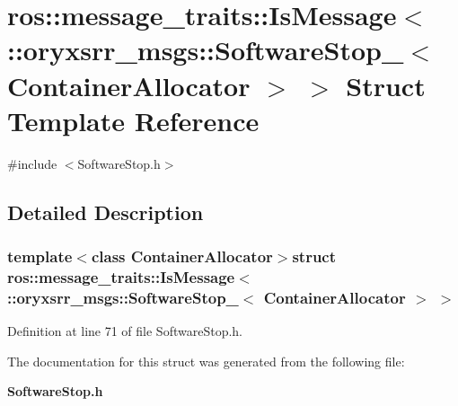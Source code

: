 \section{ros\-:\-:message\-\_\-traits\-:\-:\-Is\-Message$<$ \-:\-:oryxsrr\-\_\-msgs\-:\-:\-Software\-Stop\-\_\-$<$ \-Container\-Allocator $>$ $>$ \-Struct \-Template \-Reference}
\label{structros_1_1message__traits_1_1IsMessage_3_01_1_1oryxsrr__msgs_1_1SoftwareStop___3_01ContainerAllocator_01_4_01_4}


{\ttfamily \#include $<$\-Software\-Stop.\-h$>$}



\subsection{\-Detailed \-Description}
\subsubsection*{template$<$class Container\-Allocator$>$struct ros\-::message\-\_\-traits\-::\-Is\-Message$<$ \-::oryxsrr\-\_\-msgs\-::\-Software\-Stop\-\_\-$<$ Container\-Allocator $>$ $>$}



\-Definition at line 71 of file \-Software\-Stop.\-h.



\-The documentation for this struct was generated from the following file\-:\begin{DoxyCompactItemize}
\item 
{\bf \-Software\-Stop.\-h}\end{DoxyCompactItemize}
